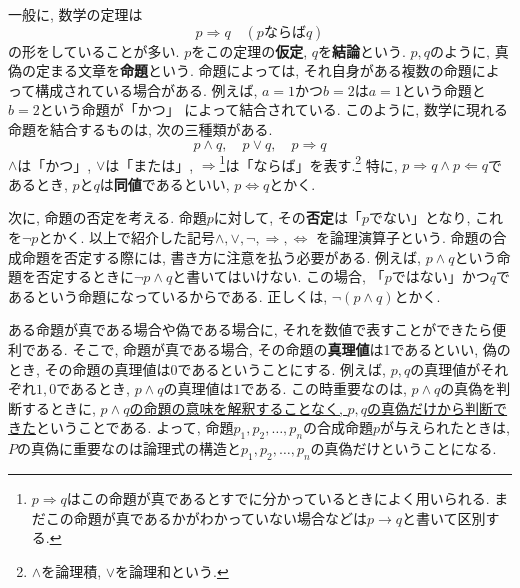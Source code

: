 \documentclass[a4j,dvipdfmx]{jsarticle}
\numberwithin{equation}{section}
\begin{document}
            一般に, 数学の定理は
            \begin{equation}
                p\Rightarrow q \quad (\text{$p$ならば$q$}) \label{eq:集合論基礎:数学の定理の構造}
            \end{equation}
            の形をしていることが多い. $p$をこの定理の\textbf{仮定}, $q$を\textbf{結論}という. $p,q$のように, 真偽の定まる文章を\textbf{命題}という.
            命題によっては, それ自身がある複数の命題によって構成されている場合がある. 例えば, $a=1$かつ$b=2$は$a=1$という命題と$b=2$という命題が「かつ」
            によって結合されている. このように, 数学に現れる命題を結合するものは, 次の三種類がある.
            \begin{equation*}
                p\land q,\quad p \lor q,\quad p \Rightarrow q 
            \end{equation*}
            $\land$は「かつ」, $\lor$は「または」, $\Rightarrow$\footnote{$p\Rightarrow q$はこの命題が真であるとすでに分かっているときによく用いられる. まだこの命題が真であるかがわかっていない場合などは$p\rightarrow q$と書いて区別する.}は「ならば」を表す.\footnote{$\land$を論理積, $\lor$を論理和という.} 特に, $p\Rightarrow q \land p \Leftarrow q$であるとき, 
            $p$と$q$は\textbf{同値}であるといい, $p \Leftrightarrow q$とかく.

            次に, 命題の否定を考える. 命題$p$に対して, その\textbf{否定}は「$p$でない」となり, これを$\lnot p$とかく. 以上で紹介した記号$\land,\lor,\lnot,\Rightarrow,\Leftrightarrow$
            を論理演算子という. 命題の合成命題を否定する際には, 書き方に注意を払う必要がある. 例えば, $p\land q$という命題を否定するときに$\lnot p\land q$と書いてはいけない.
            この場合, 「$p$ではない」かつ$q$であるという命題になっているからである. 正しくは, $\lnot(p\land q)$とかく.

            ある命題が真である場合や偽である場合に, それを数値で表すことができたら便利である. そこで, 命題が真である場合, その命題の\textbf{真理値}は1であるといい, 
            偽のとき, その命題の真理値は0であるということにする. 例えば, $p,q$の真理値がそれぞれ$1,0$であるとき, $p\land q$の真理値は$1$である.
            この時重要なのは, $p\land q$の真偽を判断するときに, \underline{$p\land q$の命題の意味を解釈することなく, $p,q$の真偽だけから判断できた}ということである.
            よって, 命題$p_1,p_2,\dots,p_n$の合成命題$p$が与えられたときは, $P$の真偽に重要なのは論理式の構造と$p_1,p_2,\dots,p_n$の真偽だけということになる.
\end{document}
